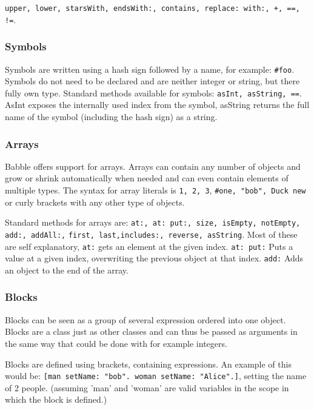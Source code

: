 \documentclass[a4paper]{article}
\begin{document}
\texttt{upper, lower, starsWith, endsWith:, contains, replace: with:, +, ==, !=}.

\subsubsection{Symbols}

Symbols are written using a hash sign followed by a name, for example: \texttt{\#foo}. Symbols do not need to be declared and are neither integer or string, but there fully own type. Standard methods available for symbols:
\texttt{asInt, asString, ==}. AsInt exposes the internally used index from the symbol, asString returns the full name of the symbol (including the hash sign) as a string.

\subsubsection{Arrays}

Babble offers support for arrays. Arrays can contain any number of objects and grow or shrink automatically when needed and can even contain elements of multiple types. The syntax for array literals is \texttt{1, 2, 3}, \texttt{\#one, "bob", Duck new} or curly brackets with any other type of objects.

Standard methods for arrays are:
\texttt{at:, at: put:, size, isEmpty, notEmpty, add:, addAll:,}
\texttt{first, last,includes:, reverse, asString}. Most of these are self explanatory, \texttt{at:} gets an element at the given index. \texttt{at: put:} Puts a value at a given index, overwriting the previous object at that index. \texttt{add:} Adds an object to the end of the array.


\subsubsection{Blocks}

Blocks can be seen as a group of several expression ordered into one object. Blocks are a class just as other classes and can thus be passed as arguments in the same way that could be done with for example integers.

Blocks are defined using brackets, containing expressions. An example of this would be:
\texttt{[man setName: "bob". woman setName: "Alice".]}, setting the name of 2 people. (assuming 'man' and 'woman' are valid variables in the scope in which the block is defined.)
\end{document}
